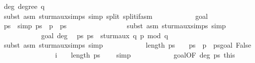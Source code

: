 \begin{isabellebody}
\ deg{\isacharcolon}\ {\isachardoublequoteopen}degree\ q\ {\isasymnoteq}\ {}{\isachardoublequoteclose}\ \isanewline
\ \ \ \ \ \ \ \ \ \ \ \ \ \ \isamarkupfalse%
\ {\isacharparenleft}subst\ {\isacharparenleft}asm{\isacharparenright}\ sturm{\isacharunderscore}aux{\isachardot}simps{\isacharcomma}\ simp\ split{\isacharcolon}\ split{\isacharunderscore}if{\isacharunderscore}asm{\isacharparenright}\isanewline
\ \ \ \ \ \ \ \ \ \ \isamarkupfalse%
\ goal{}{\isacharparenleft}{}{\isacharparenright}\ \isamarkupfalse%
\ ps{\isacharprime}\ \ {\isacharbrackleft}simp{\isacharbrackright}{\isacharcolon}\ {\isachardoublequoteopen}ps\ {\isacharequal}\ p\ {\isacharhash}\ ps{\isacharprime}{\isachardoublequoteclose}\ \isanewline
\ \ \ \ \ \ \ \ \ \ \ \ \ \ \isamarkupfalse%
\ {\isacharparenleft}subst\ {\isacharparenleft}asm{\isacharparenright}\ sturm{\isacharunderscore}aux{\isachardot}simps{\isacharcomma}\ simp{\isacharparenright}\isanewline
\ \ \ \ \ \ \ \ \ \ \isamarkupfalse%
\ goal{}{\isacharparenleft}{}{\isacharparenright}\ deg\ \isamarkupfalse%
\ ps{\isacharprime}{\isacharcolon}\ {\isachardoublequoteopen}ps{\isacharprime}\ {\isacharequal}\ sturm{\isacharunderscore}aux\ q\ {\isacharparenleft}{\isacharminus}{\isacharparenleft}p\ mod\ q{\isacharparenright}{\isacharparenright}{\isachardoublequoteclose}\isanewline
\ \ \ \ \ \ \ \ \ \ \ \ \ \ \isamarkupfalse%
\ {\isacharparenleft}subst\ {\isacharparenleft}asm{\isacharparenright}\ sturm{\isacharunderscore}aux{\isachardot}simps{\isacharcomma}\ simp{\isacharparenright}\isanewline
\ \ \ \ \ \ \ \ \ \ \isamarkupfalse%
\ {\isacharbackquoteopen}length\ ps\ {\isasymge}\ {}{\isacharbackquoteclose}\ \ {\isacharbackquoteopen}ps\ {\isacharequal}\ p\ {\isacharhash}\ ps{\isacharprime}{\isacharbackquoteclose}goal{}{\isacharparenleft}{}{\isacharparenright}\ False\isanewline
\ \ \ \ \ \ \ \ \ \ \ \ \ \ \isamarkupfalse%
\ {\isachardoublequoteopen}i\ {\isacharminus}\ {}\ {\isacharless}\ length\ ps{\isacharprime}\ {\isacharminus}\ {}{\isachardoublequoteclose}\ \isamarkupfalse%
\ simp\isanewline
\ \ \ \ \ \ \ \ \ \ \isamarkupfalse%
\ goal{}{\isacharparenleft}{}{\isacharparenright}{\isacharbrackleft}OF\ deg\ ps{\isacharprime}\ this{\isacharbrackright}\isanewline
\ \ \ \ \ \ \ \ \ \ \ \ \ \ \isamarkupfalse%

\end{isabellebody}

